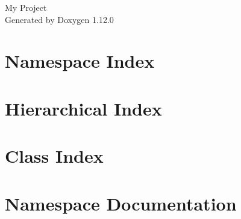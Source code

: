 \documentclass[twoside]{book}
\newcommand{\+}{\discretionary{\mbox{\scriptsize$\hookleftarrow$}}{}{}}
\newcommand{\clearemptydoublepage}{%
    \newpage{\pagestyle{empty}\cleardoublepage}%
  }
\begin{document}
  \raggedbottom
    \hypersetup{pageanchor=false,
                bookmarksnumbered=true,
                pdfencoding=unicode
               }
  \begin{titlepage}
  \vspace*{7cm}
  \begin{center}%
  {\Large My Project}\\
  \vspace*{1cm}
  {\large Generated by Doxygen 1.12.0}\\
  \end{center}
  \end{titlepage}
  \clearemptydoublepage
  \tableofcontents
  \clearemptydoublepage
  \hypersetup{pageanchor=true}

\chapter{Namespace Index}

\chapter{Hierarchical Index}

\chapter{Class Index}

\chapter{Namespace Documentation}















\end{document}
